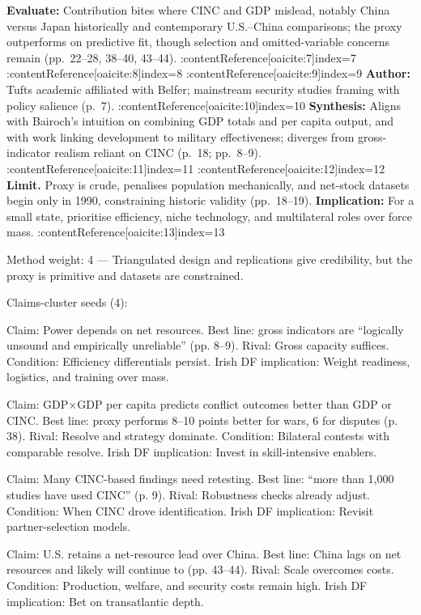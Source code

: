 \textbf{Evaluate:} Contribution bites where CINC and GDP mislead, notably China versus Japan historically and contemporary U.S.–China comparisons; the proxy outperforms on predictive fit, though selection and omitted-variable concerns remain (pp.~22–28, 38–40, 43–44). :contentReference[oaicite:7]{index=7} :contentReference[oaicite:8]{index=8} :contentReference[oaicite:9]{index=9}
\textbf{Author:} Tufts academic affiliated with Belfer; mainstream security studies framing with policy salience (p.~7). :contentReference[oaicite:10]{index=10}
\textbf{Synthesis:} Aligns with Bairoch’s intuition on combining GDP totals and per capita output, and with work linking development to military effectiveness; diverges from gross-indicator realism reliant on CINC (p.~18; pp.~8–9). :contentReference[oaicite:11]{index=11} :contentReference[oaicite:12]{index=12}
\textbf{Limit.} Proxy is crude, penalises population mechanically, and net-stock datasets begin only in 1990, constraining historic validity (pp.~18–19). \textbf{Implication:} For a small state, prioritise efficiency, niche technology, and multilateral roles over force mass. :contentReference[oaicite:13]{index=13}

Method weight: 4 — Triangulated design and replications give credibility, but the proxy is primitive and datasets are constrained.

Claims-cluster seeds (4):

Claim: Power depends on net resources. Best line: gross indicators are “logically unsound and empirically unreliable” (pp. 8–9). Rival: Gross capacity suffices. Condition: Efficiency differentials persist. Irish DF implication: Weight readiness, logistics, and training over mass.

Claim: GDP×GDP per capita predicts conflict outcomes better than GDP or CINC. Best line: proxy performs 8–10 points better for wars, 6 for disputes (p. 38). Rival: Resolve and strategy dominate. Condition: Bilateral contests with comparable resolve. Irish DF implication: Invest in skill-intensive enablers.

Claim: Many CINC-based findings need retesting. Best line: “more than 1,000 studies have used CINC” (p. 9). Rival: Robustness checks already adjust. Condition: When CINC drove identification. Irish DF implication: Revisit partner-selection models.

Claim: U.S. retains a net-resource lead over China. Best line: China lags on net resources and likely will continue to (pp. 43–44). Rival: Scale overcomes costs. Condition: Production, welfare, and security costs remain high. Irish DF implication: Bet on transatlantic depth.

